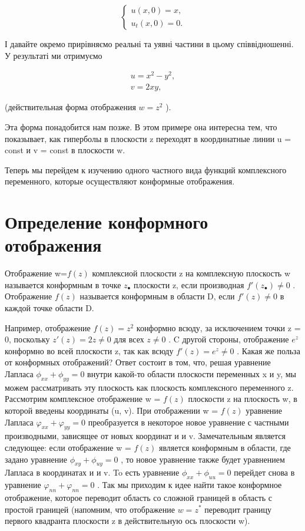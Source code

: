\documentclass[
  ukrainian,
]{article}
\begin{document}
\[
\begin{cases} u(x, 0) = x, \\ u_t(x, 0) = 0. \end{cases}
\]

І давайте окремо прирівняємо реальні та уявні частини в цьому
співвідношенні. У результаті ми отримуємо

\[
\begin{aligned} u=x^2-y^2,\\ v=2xy, \end{aligned}
\]

(действительная форма отображения \(w=z^2\) ).

Эта форма понадобится нам позже. В этом примере она интересна тем, что
показывает, как гиперболы в плоскости z переходят в координатные линии u
= const и v = const в плоскости w.

Теперь мы перейдем к изучению одного частного вида функций комплексного
переменного, которые осуществляют конформные отображения.

\section{Определение конформного
отображения}\label{ux43eux43fux440ux435ux434ux435ux43bux435ux43dux438ux435-ux43aux43eux43dux444ux43eux440ux43cux43dux43eux433ux43e-ux43eux442ux43eux431ux440ux430ux436ux435ux43dux438ux44f}

Отображение w=\(f(z)\) комплексиой плоскости z на комплексную плоскость
w называется конформным в точке \(z_{\bullet}\) плоскости z, если
производная \(f'(z_{\bullet}) \neq 0\) . Отображение \(f(z)\) называется
конформным в области D, если \(f'(z) \neq 0\) в каждой точке области D.

Например, отображение \(f(z) = z^2\) конформно всюду, за исключением
точки z = 0, поскольку \(z'(z) = 2z \neq 0\) для всех \(z \neq 0\) . C
другой стороны, отображение \(e^z\) конформно во всей плоскости z, так
как всюду \(f'(z) = e^z \neq 0\) . Какая же польза от конформных
отображений? Ответ состоит в том, что, решая уравнение Лапласа
\(\phi_{xx} + \phi_{yy} = 0\) внутри какой-то области плоскости
переменных x и y, мы можем рассматривать эту плоскость как плоскость
комплексного переменного z. Рассмотрим комплексное отображение w =
\(f(z)\) плоскости z на плоскость w, в которой введены координаты (u,
v). При отображении w = \(f(z)\) уравнение Лапласа
\(\varphi_{xx} + \varphi_{yy} = 0\) преобразуется в некоторое новое
уравнение с частными производными, зависящее от новых координат и и v.
Замечательным является следующее: если отображение w = \(f(z)\) является
конформным в области, где задано уравнение \(\phi_{xy} + \phi_{uy} = 0\)
, то новое уравнение также будет уравнением Лапласа в координатах и и v.
To есть уравнение \(\phi_{xx} + \phi_{uu} = 0\) перейдет снова в
уравнение \(\varphi_{nn} + \varphi_{nn} = 0\) . Так мы приходим к идее
найти такое конформное отображение, которое переводит область со сложной
границей в область с простой границей (напомним, что отображение
\(w=z^*\) переводит границу первого квадранта плоскости z в
действительную ось плоскости w).
\end{document}
